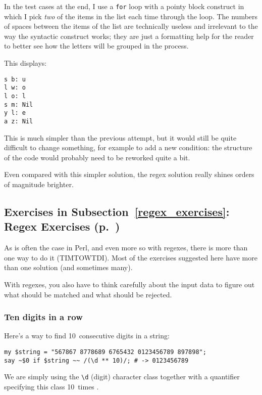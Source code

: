 In the test cases at the end, I use a {\tt for} loop with a 
pointy block construct in which I pick \emph{two} of the 
items in the list each time through the loop. The numbers of 
spaces between the items of the list are technically useless 
and irrelevant to the way the syntactic construct works; they 
are just a formatting help for the reader to better see how 
the letters will be grouped in the process.

This displays:
\begin{verbatim}
s b: u
l w: o
l o: l
s m: Nil
y l: e
a z: Nil
\end{verbatim}

This is much simpler than the previous attempt, but it would 
still be quite difficult to change something, for example 
to add a new condition: the structure of the code would 
probably need to be reworked quite a bit.

Even compared with this simpler solution, the regex solution 
really shines orders of magnitude brighter.


\subsection{Exercises in Subsection~\ref{regex_exercises}: Regex Exercises (p.~\pageref{regex_exercises})}
\label{sol_regex_exercises}

As is often the case in Perl, and even more so with 
regexes, there is more than one way to do it (TIMTOWTDI). 
Most of the exercises suggested here have more than one 
solution (and sometimes many).

With regexes, you also have to think carefully about the 
input data to figure out what should be matched and what 
should be rejected.

\subsubsection{Ten digits in a row}

Here's a way to find 10~consecutive digits in a string:

\begin{verbatim}
my $string = "567867 8778689 6765432 0123456789 897898";
say ~$0 if $string ~~ /(\d ** 10)/; # -> 0123456789
\end{verbatim}

We are simply using the \verb'\d' (digit) character class 
together with a quantifier specifying this class 10~times .

